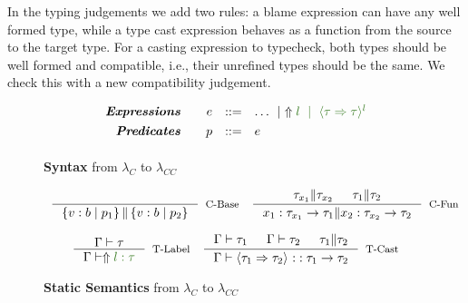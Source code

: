 In the typing judgements we add two rules:
a blame expression can have any well formed type, 
while a type cast expression behaves as a function from the 
source to the target type.
For a casting expression to typecheck, both types should be 
well formed and compatible, i.e., their unrefined types should be 
the same. We check this with a new compatibility judgement.

\begin{figure}[ht!]
\centering
$$
\begin{array}{rrcl}
\emphbf{Expressions} \quad 
  & e 
  & ::= 
  & 		 \dots
  \spmid \elabel{l} 
  \spmid \ecast{\tau}{\tau}{l} 
  \\[0.05in] 

\emphbf{Predicates} \quad 
  & p
  & ::= 
  &		e
  \\[0.05in] 

\end{array}
$$
\caption{\textbf{Syntax} from $\lambda_C$ to $\lambda_{CC}$}
\label{fig:syntax}
\end{figure}


\begin{figure}[ht!]

\medskip {}
$$\begin{array}{cc}

\inference
  {}
  {\isCompatible{\tref{b}{p_1}}{\tref{b}{p_2}}}
  [\cbase]

&

\inference
  {\isCompatible{\tau_{x_1}}{\tau_{x_2}} &&
   \isCompatible{\tau_1}{\tau_2}}
  {\isCompatible{\tfun{x_1}{\tau_{x_1}}{\tau_1}}{\tfun{x_2}{\tau_{x_2}}{\tau_2}}}
  [\cfunction]
\end{array}$$



\medskip {}
$$\begin{array}{cc}

\inference
  {\isWellFormed{\Gamma}{\tau}}
  {\hastype{\Gamma}{\elabel{l}}{\tau}}
  [\tlabel]

&

\inference
  {\isWellFormed{\Gamma}{\tau_1} &&
   \isWellFormed{\Gamma}{\tau_2} && 
   \isCompatible{\tau_1}{\tau_2}}
  {\hastype{\Gamma}{\ecast{\tau_1}{\tau_2}{}}{\tfun{}{\tau_1}{\tau_2}}}
  [\tcast]
\end{array}$$


\caption{\textbf{Static Semantics} from $\lambda_C$ to $\lambda_{CC}$}
\label{fig:rules}
\end{figure}

